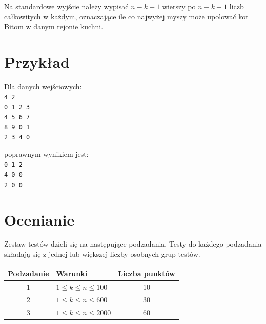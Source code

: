 \documentclass[10pt]{article}
\begin{document}
    Na standardowe wyjście należy wypisać $n-k+1$ wierszy po $n-k+1$ liczb całkowitych w każdym, oznaczające ile co najwyżej myszy może upolować kot Bitom w danym rejonie kuchni.


    \section*{Przykład}
    
    \noindent
    \begin{minipage}[t]{0.5\textwidth}
        Dla danych wejściowych:\vspace{1ex}\\
        \texttt{4 2\\0 1 2 3\\4 5 6 7\\8 9 0 1\\2 3 4 0}
    \end{minipage}
    \begin{minipage}[t]{0.5\textwidth}
        poprawnym wynikiem jest:\vspace{1ex}\\
        \texttt{0 1 2\\4 0 0\\2 0 0}
    \end{minipage}


    \section*{Ocenianie}
        
    Zestaw testów dzieli się na następujące podzadania. Testy do każdego podzadania składają się z jednej lub większej liczby osobnych grup testów.
    
    \begin{center}
        \begin{tabular}{ |c|p{9cm}|c| }
            \hline
            \textbf{Podzadanie} & \textbf{Warunki} & \textbf{Liczba punktów}\\
            \hline
            1 & $1 \leq k \leq n \leq 100$ & 10\\
            \hline
            2 & $1 \leq k \leq n \leq 600$ & 30\\
            \hline
            3 & $1 \leq k \leq n \leq 2000$ & 60\\
            \hline
        \end{tabular}
    \end{center}
\end{document}
